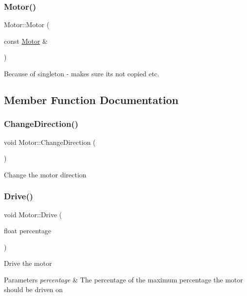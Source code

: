 \subsubsection{\texorpdfstring{Motor()}{Motor()}\hspace{0.1cm}{\footnotesize\ttfamily [2/2]}}
{\footnotesize\ttfamily Motor\+::\+Motor (\begin{DoxyParamCaption}\item[{const \hyperlink{class_motor}{Motor} \&}]{ }\end{DoxyParamCaption})\hspace{0.3cm}{\ttfamily [delete]}}

Because of singleton -\/ makes sure its not copied etc. 

\subsection{Member Function Documentation}
\hypertarget{class_motor_a4b1fb35dcf10c3e17a1614877b9b6a7d}{}\label{class_motor_a4b1fb35dcf10c3e17a1614877b9b6a7d} 
\subsubsection{\texorpdfstring{Change\+Direction()}{ChangeDirection()}}
{\footnotesize\ttfamily void Motor\+::\+Change\+Direction (\begin{DoxyParamCaption}{ }\end{DoxyParamCaption})}

Change the motor direction \hypertarget{class_motor_a653f0e6158ce2d44a1b1704c1787d74b}{}\label{class_motor_a653f0e6158ce2d44a1b1704c1787d74b} 
\subsubsection{\texorpdfstring{Drive()}{Drive()}}
{\footnotesize\ttfamily void Motor\+::\+Drive (\begin{DoxyParamCaption}\item[{float}]{percentage }\end{DoxyParamCaption})}

Drive the motor 
\begin{DoxyParams}{Parameters}
{\em percentage} & The percentage of the maximum percentage the motor should be driven on \\
\hline
\end{DoxyParams}
\hypertarget{class_motor_a20fcd40b6fd58d4894310fb3b0df9b7a}{}\label{class_motor_a20fcd40b6fd58d4894310fb3b0df9b7a} 
